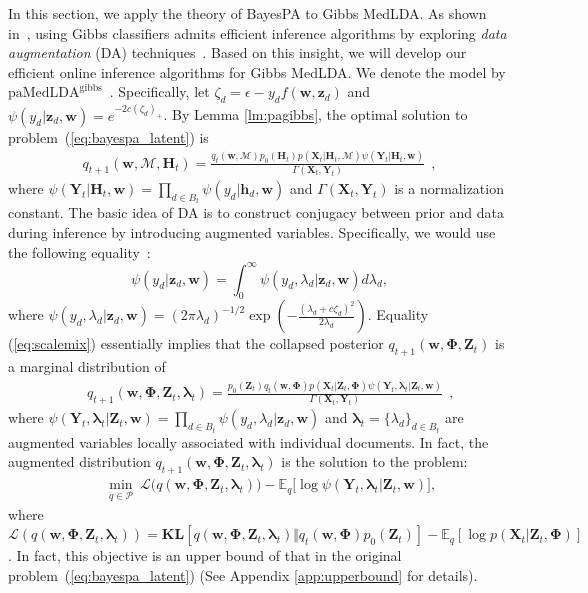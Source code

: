 \documentclass[twoside,11pt]{article}
\newcommand{\Xv}{\bm{X}}
\newcommand{\Yv}{\bm{Y}}
\newcommand{\zv}{\bm{z}}
\newcommand{\Zv}{\bm{Z}}
\newcommand{\hv}{\bm{h}}
\newcommand{\Hv}{\bm{H}}
\newcommand{\wv}{\bm{w}}
\newcommand{\Phiv}{\bm{\Phi}}
\newcommand{\lambdav}{\bm \lambda}
\newcommand{\Mv}{\bm{\mathcal{M}}}
\newcommand{\ep}{\mathbb{E}}
\newcommand{\KL}{\textbf{KL}}
\newcommand\paMedLDAgibbs{$\text{paMedLDA}^{\text{gibbs}}$~}
\begin{document}
In this section, we apply the theory of BayesPA to Gibbs MedLDA. As shown in~\citet{zhugibbs2013}, using Gibbs classifiers admits efficient inference algorithms by exploring \emph{data augmentation} (DA) techniques~\citep{tanner1987calculation, polson2011data}. Based on this insight, we will develop our efficient online inference algorithms for Gibbs MedLDA. We denote the model by \paMedLDAgibbs. Specifically, let $\zeta_d = \epsilon - y_d f(\wv, \zv_d)$ and $\psi(y_d | \zv_d, \wv) = e^{-2c (\zeta_d)_+}$. By Lemma \ref{lm:pagibbs}, the optimal solution to problem~(\ref{eq:bayespa_latent})  is
\begin{eqnarray*}
q_{t+1}(\wv, \Mv, \Hv_t) = \frac{ q_t(\wv, \Mv) p_0(\Hv_t)  p(\Xv_t | \Hv_t, \Mv) \psi(\Yv_t | \Hv_t, \wv) }{ \Gamma( \Xv_t, \Yv_t ) }~~,
\end{eqnarray*}
where  $\psi(\Yv_t | \Hv_t, \wv) = \prod_{d \in B_t} \psi(y_d | \hv_d, \wv)$   and  $\Gamma(\Xv_t, \Yv_t)$  is a normalization constant. The basic idea of DA is to construct conjugacy between prior and data during inference by introducing augmented variables. Specifically, we would use the following equality~\citep{zhugibbs2013}:
\begin{equation} \label{eq:scalemix}
\psi(y_d | \zv_d, \wv) = \int_{0}^{\infty}{\psi(y_d, \lambda_d | \bm{z}_d, \bm{w})d\lambda_d},
\end{equation}
where $\psi(y_d, \lambda_d | \zv_d, \wv) = (2\pi\lambda_d)^{-1/2}\exp\left( -\frac{(\lambda_d+c\zeta_d)^2}{2\lambda_d} \right)$. Equality (\ref{eq:scalemix}) essentially implies that the collapsed posterior $q_{t+1}(\wv, \Phiv, \Zv_t)$ is a marginal distribution of
\setlength\arraycolsep{-3pt}  \begin{eqnarray*}\label{eq:online-solution-augmented}
&& q_{t+1}(\wv, \Phiv, \Zv_t, \lambdav_t) = \frac{ p_0(\Zv_t) q_t(\wv, \Phiv) p(\Xv_t | \Zv_t, \Phiv) \psi(\Yv_t, \lambdav_t | \Zv_t, \wv) }{ \Gamma( \Xv_t, \Yv_t ) }~~,
\end{eqnarray*}
where \small $\psi(\Yv_t, \lambdav_t | \Zv_t, \wv) \!=\! \prod_{d \in B_t} \psi(y_d, \lambda_d | \zv_d, \wv)$ \normalsize and $\lambdav_t = \{\lambda_d\}_{d\in B_t}$ are augmented variables locally associated with individual documents. In fact, the augmented distribution $q_{t+1}(\wv, \Phiv, \Zv_t, \lambdav_t)$ is the solution to
the problem:
\setlength\arraycolsep{1pt} \begin{eqnarray} \label{eq:onlinepa_augmented}
&& \underset{q \in \mathcal{P}}{\operatorname{min}}{~\mathcal{L}\Big( q(\wv, \Phiv, \Zv_t, \lambdav_t) \Big) - \ep_q\Big[ \log \psi(\Yv_t, \lambdav_t | \Zv_t, \wv) \Big]},
\end{eqnarray}
where $\mathcal{L}(q(\wv, \Phiv, \Zv_t, \lambdav_t)) = \KL[ q(\wv, \Phiv, \Zv_t, \lambdav_t) \Vert q_t(\wv, \Phiv)  p_0(\Zv_t)]- \ep_q[\log p(\Xv_t|\Zv_t, \Phiv) ]$. In fact, this objective is an upper bound of that in the original problem~(\ref{eq:bayespa_latent}) (See Appendix \ref{app:upperbound} for details).
\end{document}
